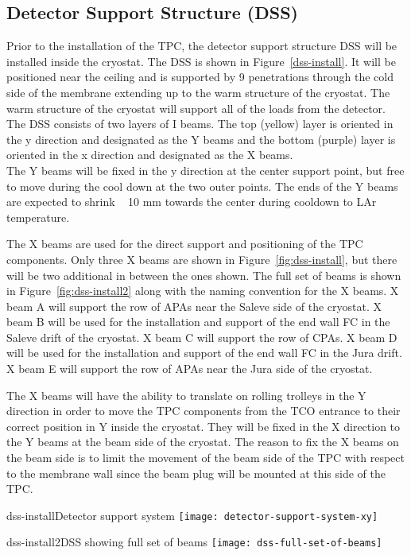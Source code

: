 \subsection{Detector Support Structure (DSS)}


Prior to the installation of the TPC, the detector support structure DSS will be installed inside the cryostat.  The DSS is shown in Figure~\ref{dss-install}.  It will be positioned near the ceiling and is supported by 9 penetrations through the cold side of the membrane extending up to the warm structure of the cryostat.  The warm structure of the cryostat will support all of the loads from the detector.  The DSS consists of two layers of I beams.  The top (yellow) layer is oriented in the y direction and designated as the Y beams and the bottom (purple) layer is oriented in the x direction and designated as the X beams. \\
The Y beams will be fixed in the y direction at the center support point, but free to move during the cool down at the two outer points.  The ends of the Y beams are expected to shrink ~ 10 mm towards the center during cooldown to LAr temperature.  

The X beams are used for the direct support and positioning of the TPC components.  Only three X beams are shown in Figure~\ref{fig:dss-install}, but there will be two additional in between the ones shown.  
The full set of beams is shown in Figure~\ref{fig:dss-install2} along with the naming convention for the X beams.
 X beam A will support the row of APAs near the Saleve side of the cryostat.  X beam B will be used for the installation and support of the end wall FC in the Saleve drift of the cryostat.  X beam C will support the row of CPAs.  X beam D will be used for the installation and support of the end wall FC in the Jura drift.  X beam E will support the row of APAs near the Jura side of the cryostat.  

The X beams will have the ability to translate on rolling trolleys in the Y direction in order to move the TPC components from the TCO entrance to their correct position in Y inside the cryostat.  They will be fixed in the X direction to the Y beams at the beam side of the cryostat.  The reason 
to fix the X beams on the beam side is to limit the movement of the beam side of the TPC with respect to the membrane wall since
the beam plug will be mounted at this side of the TPC.  

\begin{cdrfigure}{dss-install}{Detector support system}
\texttt{[image: detector-support-system-xy]}
\end{cdrfigure}

\begin{cdrfigure}{dss-install2}{DSS showing full set of beams}
 \texttt{[image: dss-full-set-of-beams]}
\end{cdrfigure}